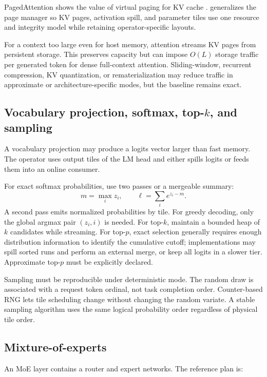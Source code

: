 PagedAttention shows the value of virtual paging for KV cache \cite{kwon2023pagedattention}. \AMS generalizes the page manager so KV pages, activation spill, and parameter tiles use one resource and integrity model while retaining operator-specific layouts.

For a context too large even for host memory, attention streams KV pages from persistent storage. This preserves capacity but can impose $O(L)$ storage traffic per generated token for dense full-context attention. Sliding-window, recurrent compression, KV quantization, or rematerialization may reduce traffic in approximate or architecture-specific modes, but the baseline remains exact.

\subsection{Vocabulary projection, softmax, \texorpdfstring{top-$k$}{top-k}, and sampling}

A vocabulary projection may produce a logits vector larger than fast memory. The operator uses output tiles of the LM head and either spills logits or feeds them into an online consumer.

For exact softmax probabilities, use two passes or a mergeable summary:
\[
  m=\max_i z_i,
  \qquad \ell=\sum_i e^{z_i-m}.
\]
A second pass emits normalized probabilities by tile. For greedy decoding, only the global argmax pair $(z_i,i)$ is needed. For top-$k$, maintain a bounded heap of $k$ candidates while streaming. For top-$p$, exact selection generally requires enough distribution information to identify the cumulative cutoff; implementations may spill sorted runs and perform an external merge, or keep all logits in a slower tier. Approximate top-$p$ must be explicitly declared.

Sampling must be reproducible under deterministic mode. The random draw is associated with a request token ordinal, not task completion order. Counter-based RNG lets tile scheduling change without changing the random variate. A stable sampling algorithm uses the same logical probability order regardless of physical tile order.

\subsection{Mixture-of-experts}

An MoE layer contains a router and expert networks. The reference plan is:

